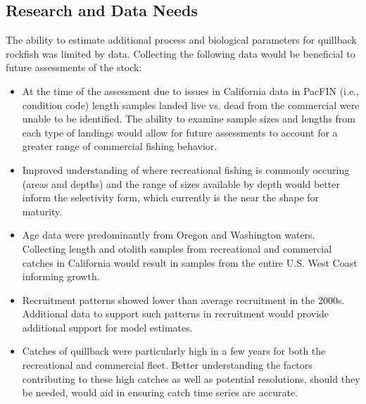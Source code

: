 \documentclass[11pt,
  english,
  a4paper,
]{article}
\begin{document}

\hypertarget{research-and-data-needs}{%
\subsection{Research and Data Needs}\label{research-and-data-needs}}

\leavevmode\tagmcend\tagstructend


The ability to estimate additional process and biological parameters for quillback rockfish was limited by data. Collecting the following data would be beneficial to future assessments of the stock:

\leavevmode\tagmcend\tagstructend\par

\begin{itemize}

  \item At the time of the assessment due to issues in California data in PacFIN (i.e., condition code) length samples landed live vs. dead from the commercial were unable to be identified. The ability to examine sample sizes and lengths from each type of landings would allow for future assessments to account for a greater range of commercial fishing behavior.
  
  \item Improved understanding of where recreational fishing is commonly occuring (areas and depths) and the range of sizes available by depth would better inform the selectivity form, which currently is the near the shape for maturity.  

    \item Age data were predominantly from Oregon and Washington waters. Collecting length and otolith samples from recreational and commercial catches in California would result in samples from the entire U.S. West Coast informing growth.
    
    \item Recruitment patterns showed lower than average recruitment in the 2000s. Additional data to support such patterns in recruitment would provide additional support for model estimates. 
    
    \item Catches of quillback were particularly high in a few years for both the recreational and commercial fleet. Better understanding the factors contributing to these high catches as well as potential resolutions, should they be needed, would aid in ensuring catch time series are accurate.  
    
\end{itemize}
\end{document}
